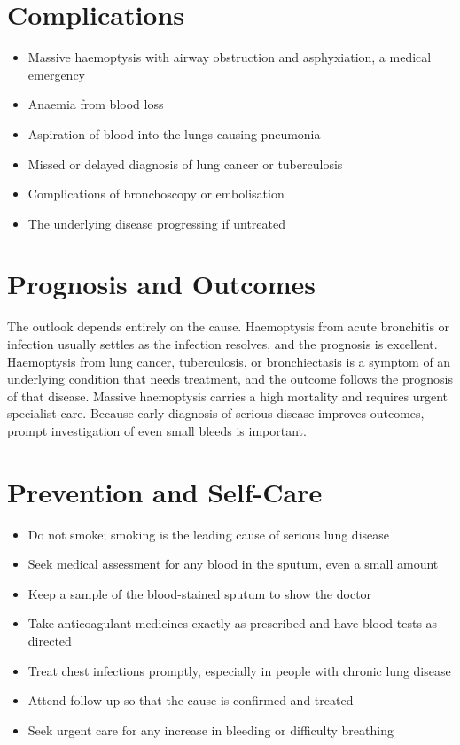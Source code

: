 \section*{Complications}
\begin{itemize}
    \item Massive haemoptysis with airway obstruction and asphyxiation, a medical emergency
    \item Anaemia from blood loss
    \item Aspiration of blood into the lungs causing pneumonia
    \item Missed or delayed diagnosis of lung cancer or tuberculosis
    \item Complications of bronchoscopy or embolisation
    \item The underlying disease progressing if untreated
\end{itemize}

\section*{Prognosis and Outcomes}
The outlook depends entirely on the cause. Haemoptysis from acute bronchitis or infection usually settles as the infection resolves, and the prognosis is excellent. Haemoptysis from lung cancer, tuberculosis, or bronchiectasis is a symptom of an underlying condition that needs treatment, and the outcome follows the prognosis of that disease. Massive haemoptysis carries a high mortality and requires urgent specialist care. Because early diagnosis of serious disease improves outcomes, prompt investigation of even small bleeds is important.

\section*{Prevention and Self-Care}
\begin{itemize}
    \item Do not smoke; smoking is the leading cause of serious lung disease
    \item Seek medical assessment for any blood in the sputum, even a small amount
    \item Keep a sample of the blood-stained sputum to show the doctor
    \item Take anticoagulant medicines exactly as prescribed and have blood tests as directed
    \item Treat chest infections promptly, especially in people with chronic lung disease
    \item Attend follow-up so that the cause is confirmed and treated
    \item Seek urgent care for any increase in bleeding or difficulty breathing
\end{itemize}

